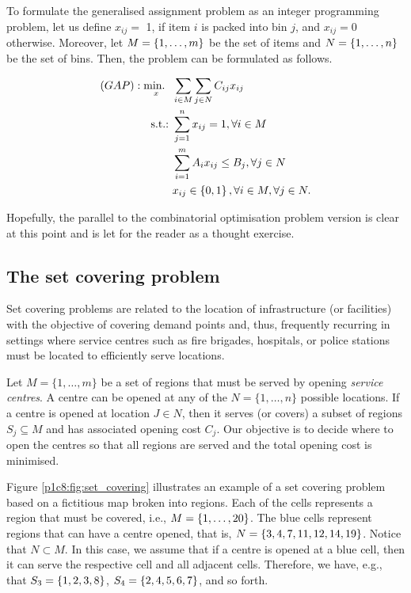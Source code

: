 To formulate the generalised assignment problem as an integer programming problem, let us define $x_{ij} =$ 1, if item $i$ is packed into bin $j$, and $x_{ij} = 0$ otherwise. Moreover, let $M = \left\{ 1,\dots,m \right \}$ be the set of items and $N = \left\{ 1,\dots,n \right \}$ be the set of bins. Then, the problem can be formulated as follows.

\begin{align*}
	(GAP) : \mathop{\text{min.~}}_x \ & \sum_{i \in M}\sum_{j \in N} C_{ij}x_{ij} \\
	\mathop{\text{s.t.:~}} & \sum_{j=1}^n x_{ij} = 1, \forall i \in M\\
	  & \sum_{i=1}^m A_{i}x_{ij} \leq B_j, \forall j \in N\\
	  & x_{ij} \in \left\{ 0,1 \right \}, \forall i \in M, \forall j \in N. 
\end{align*} 

Hopefully, the parallel to the combinatorial optimisation problem version is clear at this point and is let for the reader as a thought exercise. 


\subsection{The set covering problem}

Set covering problems are related to the location of infrastructure (or facilities) with the objective of covering demand points and, thus, frequently recurring in settings where service centres such as fire brigades, hospitals, or police stations must be located to efficiently serve locations.

Let $M = \{1,\dots,m\}$ be a set of regions that must be served by opening \emph{service centres}. A centre can be opened at any of the $N = \{1,\dots,n\}$ possible locations. If a centre is opened at location $J \in N$, then it serves (or covers) a subset of regions $S_j \subseteq M$ and has associated opening cost $C_j$. Our objective is to decide where to open the centres so that all regions are served and the total opening cost is minimised. 

Figure \ref{p1c8:fig:set_covering} illustrates an example of a set covering problem based on a fictitious map broken into regions. Each of the cells represents a region that must be covered, i.e., $M = \left\{ 1,\dots, 20 \right \}$. The blue cells represent regions that can have a centre opened, that is, $N = \left\{ 3,4,7,11,12,14,19 \right \}$. Notice that $N \subset M$. In this case, we assume that if a centre is opened at a blue cell, then it can serve the respective cell and all adjacent cells. Therefore, we have, e.g., that $S_3 = \left\{ 1,2,3,8 \right \}$, $S_4=\left\{ 2,4,5,6,7 \right \}$, and so forth.

